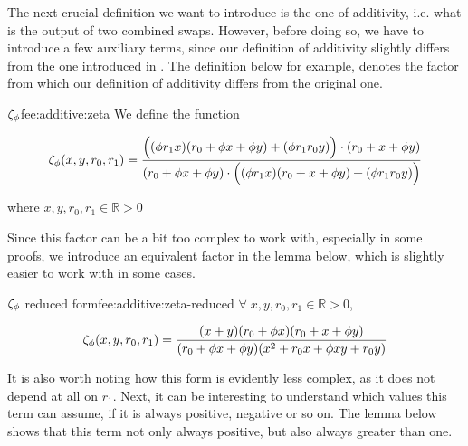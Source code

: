 The next crucial definition we want to introduce is the one of additivity, i.e. what is the output of two combined swaps. However, before doing so, we have to introduce a few auxiliary terms, since our definition of additivity slightly differs from the one introduced in \cite{BCL22lmcs}. The definition below for example, denotes the factor from which our definition of additivity differs from the original one.  


\begin{defi}{$\Zfee$}{fee:additive:zeta}
We define the function 

    \begin{align*}
        \Z x y {r_0} {r_1} = 
            \frac
            {\Big ( (\fee \ammR[1] x)(\ammR[0] + \fee x + \fee y) + (\fee \ammR[1] \ammR[0] y)\Big ) \cdot (\ammR[0] + x + \fee y)}
            {(\ammR[0] + \fee x + \fee y) \cdot \Big ( (\fee \ammR[1] x)(\ammR[0] + x + \fee y) + (\fee \ammR[1] \ammR[0] y)\Big )}
    \end{align*}

where $x, y, r_0, r_1 \in \mathbb{R}>0$
\end{defi}

Since this factor can be a bit too complex to work with, especially in some proofs, we introduce an equivalent factor in the lemma below, which is slightly easier to work with in some cases. 

\begin{lemma}{$\Zfee$ reduced form}{fee:additive:zeta-reduced}
    $\forall \; x, y, r_0, r_1 \in \mathbb{R}>0$,

    \begin{align*}
        \Z x y {r_0} {r_1} =
            \frac
            {(x + y)(\ammR[0] + \fee x)(\ammR[0] + x + \fee y)}
            {(\ammR[0] + \fee x + \fee y)(x^2 + \ammR[0] x +\fee x y + \ammR[0] y)} 
    \end{align*}
\end{lemma}

It is also worth noting how this form is evidently less complex, as it does not depend at all on $r_1$. Next, it can be interesting to understand which values this term can assume, if it is always positive, negative or so on. The lemma below shows that this term not only always positive, but also always greater than one.

